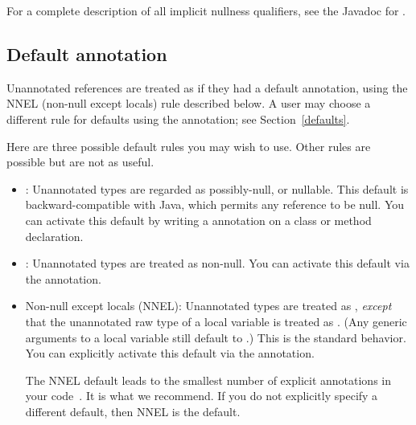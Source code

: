 For a complete description of all implicit nullness qualifiers, see the
Javadoc for .



\subsection{Default annotation\label{null-defaults}}

Unannotated references are treated as if they had a default annotation,
using the NNEL (non-null except locals) rule described below.
A user may choose a different rule for defaults using the
 annotation; see
Section~\ref{defaults}.

\begin{sloppy}
Here are three possible default rules you may wish to use.  Other rules are
possible but are not as useful.
\begin{itemize}
\item
  :  Unannotated types are regarded as possibly-null, or
  nullable.  This default is backward-compatible with Java, which permits
  any reference to be null.  You can activate this default by writing
  a  annotation on a
  class or method
  declaration.
\item
  :  Unannotated types are treated as non-null.
  You can activate this
  default via the
   annotation.
\item
  Non-null except locals (NNEL):  Unannotated types are treated as
  , \emph{except} that the
  unannotated raw type of a local variable is treated as
  .  (Any generic arguments to a
  local variable still default to
  .)  This is the standard
  behavior.  You can explicitly activate this default via the
  annotation.

  The NNEL default leads to the smallest number of explicit annotations in
  your code~\cite{PapiACPE2008}.  It is what we recommend.  If you do not
  explicitly specify a different default, then NNEL is the default.
\end{itemize}
\end{sloppy}

